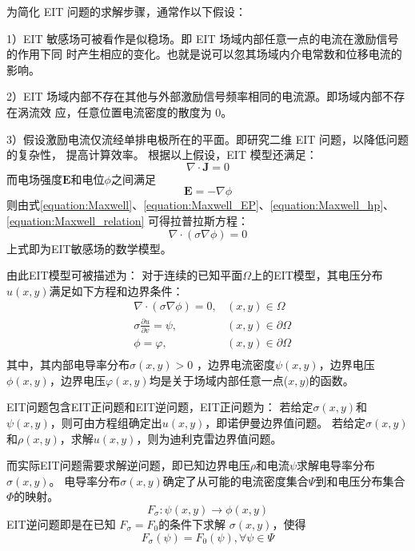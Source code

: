 为简化 EIT 问题的求解步骤，通常作以下假设：

1）EIT 敏感场可被看作是似稳场。即 EIT 场域内部任意一点的电流在激励信号的作用下同
  时产生相应的变化。也就是说可以忽其场域内介电常数和位移电流的影响。

2）EIT 场域内部不存在其他与外部激励信号频率相同的电流源。即场域内部不存在涡流效
  应，任意位置电流密度的散度为 0。

3）假设激励电流仅流经单排电极所在的平面。即研究二维 EIT 问题，以降低问题的复杂性，
  提高计算效率。
根据以上假设，EIT 模型还满足：
\begin{equation}
  \label{equation:Maxwell_hp}
  \nabla \cdot \boldsymbol{J} = 0
\end{equation}
而电场强度$\boldsymbol{E}$和电位$\phi$之间满足
\begin{equation}
  \label{equation:Maxwell_EP}
  \boldsymbol{E} = - \nabla \phi
\end{equation}
则由式\cref{equation:Maxwell}、\cref{equation:Maxwell_EP}、\cref{equation:Maxwell_hp}、\cref{equation:Maxwell_relation}
可得拉普拉斯方程：
\begin{equation}
  \nabla \cdot (\sigma\nabla\phi) = 0
\end{equation}
上式即为EIT敏感场的数学模型。

由此EIT模型可被描述为：
对于连续的已知平面$\Omega$上的EIT模型，其电压分布$u(x,y)$满足如下方程和边界条件：
\begin{equation}
  \begin{aligned}
  &\nabla \cdot (\sigma \nabla \phi) = 0, &(x, y)\in {\Omega} \\
  &\sigma\frac{\partial{u}}{\partial{v}} = \psi, &(x,y) \in {\partial{\Omega}} \\
  &\phi = \varphi, &(x,y)\in\partial{\Omega} \\
\end{aligned}
\end{equation}
其中，其内部电导率分布$\sigma(x,y) > 0$ ，边界电流密度$\psi(x,y)$，边界电压$\phi(x,y)$，边界电压$\varphi(x,y)$均是关于场域内部任意一点($x,y)$的函数。

EIT问题包含EIT正问题和EIT逆问题，EIT正问题为：
若给定$\sigma(x,y)$和$\psi(x,y)$，则可由方程组确定出$u(x,y)$，即诺伊曼边界值问题。
若给定$\sigma(x,y)$和$\rho(x,y)$，求解$u(x,y)$，则为迪利克雷边界值问题。

而实际EIT问题需要求解逆问题，即已知边界电压$\rho$和电流$\psi$求解电导率分布$\sigma(x,y)$。
电导率分布$\sigma(x,y)$确定了从可能的电流密度集合$\Psi$到和电压分布集合$\Phi$的映射。
\begin{equation}
  F_\sigma: \psi(x,y) \rightarrow \phi(x,y)
\end{equation}
EIT逆问题即是在已知 $F_{\sigma} = F_0$的条件下求解 $\sigma(x,y)$，使得
\begin{equation}
  F_{\sigma}(\psi) = F_{0}(\psi),  \forall \psi \in \Psi
\end{equation}


